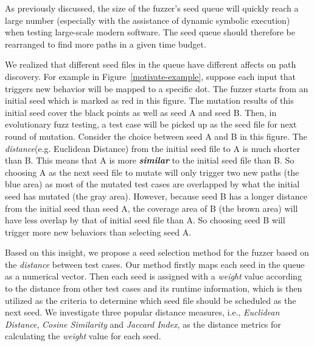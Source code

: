As previously discussed, the size of the fuzzer's seed queue will quickly 
reach a large number (especially with the assistance of dynamic symbolic 
execution) when testing large-scale modern software. The seed queue should 
therefore be rearranged to find more paths in a given time budget.

We realized that different seed files in the queue have different affects 
on path discovery. For example in Figure~\ref{motivate-example}, suppose 
each input that triggers new behavior will be mapped to a specific dot. 
The fuzzer starts from an initial seed which is marked as red in this figure. 
The mutation results of this initial seed cover the black points 
as well as seed A and seed B. Then, in evolutionary fuzz testing, a 
test case will be picked up as the seed file for next round of mutation. 
Consider the choice between seed A and B in this figure.
The \emph{distance}(e.g. Euclidean Distance) from the initial seed file 
to A is much shorter than B. 
This means that A is more \textbf{\textit{similar}} to the initial seed 
file than B. So choosing A as the next seed file to mutate will only 
trigger two new paths (the blue area) as most of the mutated test cases 
are overlapped by what the initial seed has mutated (the gray area). 
However, because seed B has a longer distance from the initial seed than 
seed A, the coverage area of B (the brown area) will have less overlap 
by that of initial seed file than A. So choosing seed B will trigger 
more new behaviors than selecting seed A.

Based on this insight, we propose a seed selection method for the fuzzer 
based on the \textit{distance} between test cases.
Our method firstly maps each seed in the queue as a numerical vector. 
Then each seed is assigned with a \emph{weight} value according to the 
distance from other test cases and its runtime information, which is 
then utilized as the criteria to determine which seed file should be 
scheduled as the next seed. 
We investigate three popular distance measures, i.e., \textit{Euclidean Distance}, 
\textit{Cosine Similarity} and \textit{Jaccard Index}, as the distance metrics 
for calculating the \textit{weight} value for each seed. 

